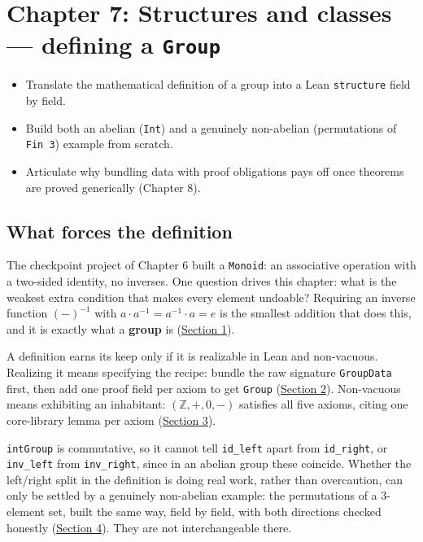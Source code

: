 \chapter{\texorpdfstring{Chapter 7: Structures and classes --- defining a \texttt{Group}}{Chapter 7: Structures and classes --- defining a Group}}\label{sec:07-groups:00-index:1}

\begin{learningobjectives}
\begin{itemize}
\tightlist
\item
  Translate the mathematical definition of a group into a Lean \texttt{structure} field by field.
\item
  Build both an abelian (\texttt{Int}) and a genuinely non-abelian (permutations of \texttt{Fin 3}) example from scratch.
\item
  Articulate why bundling data with proof obligations pays off once theorems are proved generically (Chapter 8).
\end{itemize}
\end{learningobjectives}


\section{What forces the definition}\label{sec:07-groups:00-index:2}

The checkpoint project of Chapter 6 built a \texttt{Monoid}: an associative operation with a two-sided identity, no inverses. One question drives this chapter: what is the weakest extra condition that makes every element undoable? Requiring an inverse function \((-)^{-1}\) with \(a \cdot a^{-1} =
a^{-1} \cdot a = e\) is the smallest addition that does this, and it is exactly what a \textbf{group} is (\hyperref[sec:07-groups:01-definition:1]{Section 1}).

A definition earns its keep only if it is realizable in Lean and non-vacuous. Realizing it means specifying the recipe: bundle the raw signature \texttt{GroupData} first, then add one proof field per axiom to get \texttt{Group} (\hyperref[sec:07-groups:02-translating:1]{Section 2}). Non-vacuous means exhibiting an inhabitant: \((\mathbb{Z}, +, 0, -)\) satisfies all five axioms, citing one core-library lemma per axiom (\hyperref[sec:07-groups:03-integers-example:1]{Section 3}).

\texttt{intGroup} is commutative, so it cannot tell \texttt{id\_\allowbreak{}left} apart from \texttt{id\_\allowbreak{}right}, or \texttt{inv\_\allowbreak{}left} from \texttt{inv\_\allowbreak{}right}, since in an abelian group these coincide. Whether the left/right split in the definition is doing real work, rather than overcaution, can only be settled by a genuinely non-abelian example: the permutations of a 3-element set, built the same way, field by field, with both directions checked honestly (\hyperref[sec:07-groups:04-permutations-example:1]{Section 4}). They are not interchangeable there.

